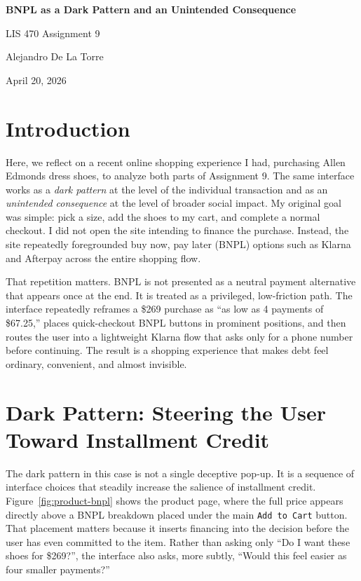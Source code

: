 \documentclass[11pt]{article}
\begin{document}
\begin{center}
    {\LARGE\bfseries BNPL as a Dark Pattern and an Unintended Consequence\par}
    \vspace{0.35em}
    {\large LIS 470 Assignment 9\par}
    \vspace{0.75em}
    {\normalsize Alejandro De La Torre\par}
    {\normalsize April 20, 2026\par}
\end{center}

\vspace{1em}

\section{Introduction}

Here, we reflect on a recent online shopping experience I had, purchasing Allen Edmonds dress shoes, to analyze both parts of Assignment 9. The same interface works as a \textit{dark pattern} at the level of the individual transaction and as an \textit{unintended consequence} at the level of broader social impact. My original goal was simple: pick a size, add the shoes to my cart, and complete a normal checkout. I did not open the site intending to finance the purchase. Instead, the site repeatedly foregrounded buy now, pay later (BNPL) options such as Klarna and Afterpay across the entire shopping flow.

That repetition matters. BNPL is not presented as a neutral payment alternative that appears once at the end. It is treated as a privileged, low-friction path. The interface repeatedly reframes a \$269 purchase as ``as low as 4 payments of \$67.25,'' places quick-checkout BNPL buttons in prominent positions, and then routes the user into a lightweight Klarna flow that asks only for a phone number before continuing. The result is a shopping experience that makes debt feel ordinary, convenient, and almost invisible.

\section{Dark Pattern: Steering the User Toward Installment Credit}

The dark pattern in this case is not a single deceptive pop-up. It is a sequence of interface choices that steadily increase the salience of installment credit. Figure~\ref{fig:product-bnpl} shows the product page, where the full price appears directly above a BNPL breakdown placed under the main \texttt{Add to Cart} button. That placement matters because it inserts financing into the decision before the user has even committed to the item. Rather than asking only ``Do I want these shoes for \$269?'', the interface also asks, more subtly, ``Would this feel easier as four smaller payments?''
\end{document}
